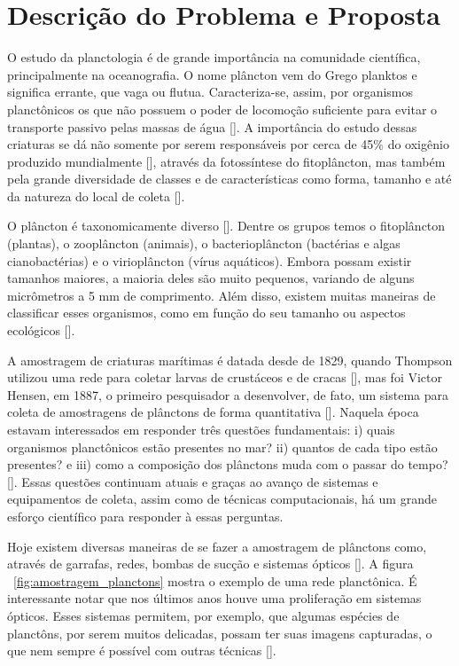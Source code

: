 \chapter{Descrição do Problema e Proposta}
\label{cap:Proposta}

O estudo da planctologia é de grande importância na comunidade científica, principalmente na oceanografia. O nome plâncton vem do Grego planktos e significa errante, que vaga ou flutua. Caracteriza-se, assim, por organismos planctônicos os que não possuem o poder de locomoção suficiente para evitar o transporte passivo pelas massas de água [\cite{calazans2011organismos}].  A importância do estudo dessas criaturas se dá não somente por serem responsáveis por cerca de 45\% do oxigênio produzido mundialmente [\cite{brierleyplankton}],  através da fotossíntese do fitoplâncton, mas também pela grande diversidade de classes e de características como forma, tamanho e até da natureza do local de coleta [\cite{calazans2011organismos}]. 

O plâncton é taxonomicamente diverso [\cite{brierleyplankton}]. Dentre os grupos temos o fitoplâncton (plantas), o zooplâncton (animais), o bacterioplâncton (bactérias e algas cianobactérias) e o virioplâncton (vírus aquáticos). Embora possam existir tamanhos maiores, a maioria deles são muito pequenos, variando de alguns micrômetros a 5 mm de comprimento. Além disso, existem muitas maneiras de classificar esses organismos, como em função do seu tamanho ou aspectos ecológicos [\cite{calazans2011organismos}].


A amostragem de criaturas marítimas é datada desde de 1829, quando Thompson utilizou uma rede para coletar larvas de crustáceos e de cracas [\cite{brierleyplankton}], mas foi Victor Hensen, em 1887, o primeiro pesquisador a desenvolver, de fato, um sistema para coleta de amostragens de plânctons de forma quantitativa [\cite{benfield2007rapid, wiebe2003hensen, allen1919contribution}]. Naquela época estavam interessados em responder três questões fundamentais: i) quais organismos planctônicos estão presentes no mar? ii) quantos de cada tipo estão presentes? e iii) como a composição dos plânctons muda com o passar do tempo?  [\cite{benfield2007rapid}]. Essas questões continuam atuais e graças ao avanço de sistemas e equipamentos de coleta, assim como de técnicas computacionais, há um grande esforço científico para responder à essas perguntas.


Hoje existem diversas maneiras de se fazer a amostragem de plânctons como, através de garrafas, redes, bombas de sucção e sistemas ópticos [\cite{calazans2011organismos}]. A figura ~\ref{fig:amostragem_planctons} mostra o exemplo de uma rede planctônica. É interessante notar que nos últimos anos houve uma proliferação em sistemas ópticos. Esses sistemas permitem, por exemplo, que algumas espécies de planctôns, por serem muitos delicadas, possam ter suas imagens capturadas, o que nem sempre é possível com outras técnicas [\cite{benfield2007rapid}].


